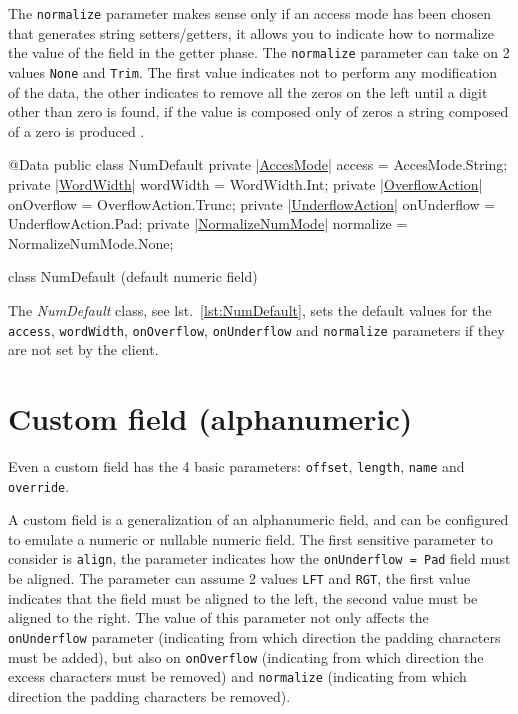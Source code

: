 \documentclass[a4paper,10pt]{report}
\newenvironment{elisting}[1][H]
  {\captionsetup{aboveskip=0pt}\begin{listing}[#1]}
  {\end{listing}%
}
\begin{document}
The \verb!normalize! parameter makes sense only if an access mode has been 
chosen that generates string setters/getters, it allows you to indicate how to 
normalize the value of the field in the getter phase. 
The \verb!normalize! parameter can take on 2 values \verb!None! and \verb!Trim!. 
The first value indicates not to perform any modification of the data, the 
other indicates to remove all the zeros on the left until a digit other than 
zero is found, if the value is composed only of zeros a string composed of a 
zero is produced .

\begin{elisting}[!htb]
\begin{javacode}
@Data
public class NumDefault {
    private |\hyperref[lst:AccesMode]{AccesMode}| access = AccesMode.String;
    private |\hyperref[lst:WordWidth]{WordWidth}| wordWidth = WordWidth.Int;
    private |\hyperref[lst:OverflowAction]{OverflowAction}| onOverflow = OverflowAction.Trunc;
    private |\hyperref[lst:UnderflowAction]{UnderflowAction}| onUnderflow = UnderflowAction.Pad;
    private |\hyperref[lst:NormalizeNumMode]{NormalizeNumMode}| normalize = NormalizeNumMode.None;
}
\end{javacode}
\caption{class NumDefault (default numeric field)}
\label{lst:NumDefault}
\end{elisting}

The \textsl{NumDefault} class, see lst.~\ref{lst:NumDefault}, sets the default 
values for the \verb!access!, \verb!wordWidth!, \verb!onOverflow!, 
\texttt{onUnder\-flow} and \verb!normalize! parameters if they are not set by the 
client.

\section{Custom field (alphanumeric)}
Even a custom field has the 4 basic parameters: \verb!offset!, \verb!length!,
\verb!name! and \verb!override!.

A custom field is a generalization of an alphanumeric field, and can be 
configured to emulate a numeric or nullable numeric field. 
The first sensitive parameter to consider is \verb!align!, the parameter 
indicates how the \texttt{onUnderflow = Pad} field must be aligned. 
The parameter can assume 2 values \verb!LFT! and \verb!RGT!, the first value 
indicates that the field must be aligned to the left, the second value must be 
aligned to the right.
The value of this parameter not only affects the \verb!onUnderflow! parameter 
(indicating from which direction the padding characters must be added), but 
also on \verb!onOverflow! (indicating from which direction the excess characters 
must be removed) and \verb!normalize! (indicating from which direction the 
padding characters be removed).
\end{document}
